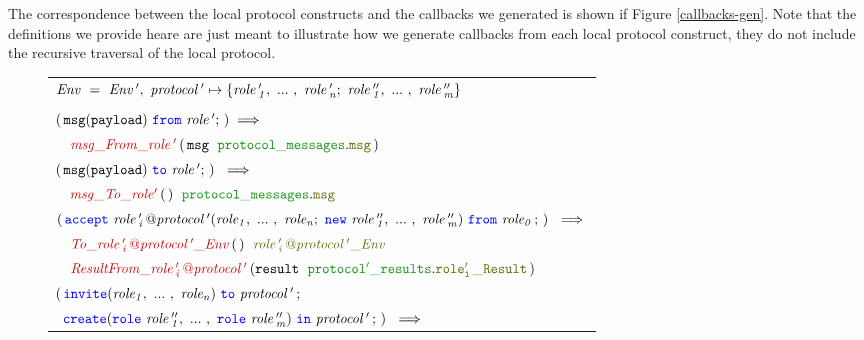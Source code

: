 \documentclass[12pt,twoside]{report}
\begin{document}
The correspondence between the local protocol constructs and the callbacks we generated is shown if Figure \ref{callbacks-gen}. Note that the definitions we provide heare are just meant to illustrate how we generate callbacks from each local protocol construct, they do not include the recursive traversal of the local protocol.\\

\begin{figure}[!h]
    \begin{center}
        \begin{tabular}{l}
            $\mathit{Env\ =\ Env\,',\ protocol\,' \mapsto \{\roles{role\,'}{n};\ \roles{role\,''}{m}\}}$\\\\

            $(\,\scrmessage{msg}{payload}\ \from\ \mathit{role\,'};\,) \implies$\\[6pt]
            
            $\quad \functionname{msg\_From\_role\,'}\,(\,\varname{msg}\ \;\pkgstructaccess{protocol\_messages}{msg}\,)\;\ $\\[15pt]
            
            $(\,\scrmessage{msg}{payload}\ \scrto\ \mathit{role\,'};\,)\ \implies$\\[6pt] 
            
            $\quad \functionname{msg\_To\_role'}\,(\,)\;\ \pkgstructaccess{protocol\_messages}{msg}$\\[15pt]
            
            $(\,\acceptL{role\,'_i\,@protocol\,'}{role}{role\,''}{role_0}\,;\,)\ \implies$\\[6pt]
            
            $\quad \functionname{To\_\localprotocol{role\,'_i\,}{protocol\,'}\_Env}\,(\,)\;\ \interfacename{\localprotocol{role\,'_i\,}{protocol\,'}\_Env}$\\[3pt]

            $\quad \functionname{ResultFrom\_\localprotocol{role\,'_i\,}{protocol\,'}}\,(\varname{result}\ \;\pkgstructaccess{protocol'\_results}{role'_i\,\_Result}\,)\;$\\[15pt]

            $(\,\invite(\roles{role}{n})\ \scrto\ \mathit{protocol\,'}\,;$\\[1.5pt] 
            $\ \,\create(\rolessig{role\,''}{m})\ \scrin\ \mathit{protocol\,'}\,;\,)\ \implies$\\[6pt]
            

\end{tabular}
\end{center}
\end{figure}
\end{document}
